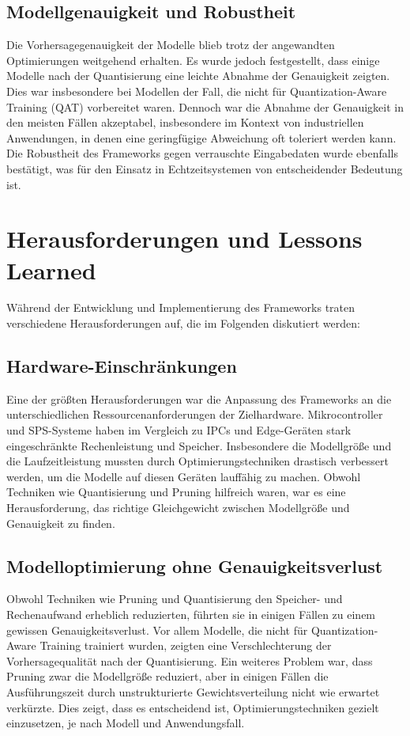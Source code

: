 \subsection{Modellgenauigkeit und Robustheit}
Die Vorhersagegenauigkeit der Modelle blieb trotz der angewandten Optimierungen weitgehend erhalten. Es wurde jedoch festgestellt, 
dass einige Modelle nach der Quantisierung eine leichte Abnahme der Genauigkeit zeigten. Dies war insbesondere bei Modellen der Fall, 
die nicht für Quantization-Aware Training (QAT) vorbereitet waren. Dennoch war die Abnahme der Genauigkeit in den meisten Fällen akzeptabel, 
insbesondere im Kontext von industriellen Anwendungen, in denen eine geringfügige Abweichung oft toleriert werden kann. 
Die Robustheit des Frameworks gegen verrauschte Eingabedaten wurde ebenfalls bestätigt, was für den Einsatz in Echtzeitsystemen von 
entscheidender Bedeutung ist.

\section{Herausforderungen und Lessons Learned}
Während der Entwicklung und Implementierung des Frameworks traten verschiedene Herausforderungen auf, die im Folgenden diskutiert werden:

\subsection{Hardware-Einschränkungen}
Eine der größten Herausforderungen war die Anpassung des Frameworks an die unterschiedlichen Ressourcenanforderungen der Zielhardware. 
Mikrocontroller und SPS-Systeme haben im Vergleich zu IPCs und Edge-Geräten stark eingeschränkte Rechenleistung und Speicher. Insbesondere die 
Modellgröße und die Laufzeitleistung mussten durch Optimierungstechniken drastisch verbessert werden, um die Modelle auf diesen Geräten 
lauffähig zu machen. Obwohl Techniken wie Quantisierung und Pruning hilfreich waren, war es eine Herausforderung, das richtige Gleichgewicht 
zwischen Modellgröße und Genauigkeit zu finden.

\subsection{Modelloptimierung ohne Genauigkeitsverlust}
Obwohl Techniken wie Pruning und Quantisierung den Speicher- und Rechenaufwand erheblich reduzierten, führten sie in einigen Fällen zu einem 
gewissen Genauigkeitsverlust. Vor allem Modelle, die nicht für Quantization-Aware Training trainiert wurden, zeigten eine Verschlechterung der 
Vorhersagequalität nach der Quantisierung. Ein weiteres Problem war, dass Pruning zwar die Modellgröße reduziert, aber in einigen Fällen 
die Ausführungszeit durch unstrukturierte Gewichtsverteilung nicht wie erwartet verkürzte. Dies zeigt, dass es entscheidend ist, 
Optimierungstechniken gezielt einzusetzen, je nach Modell und Anwendungsfall.

